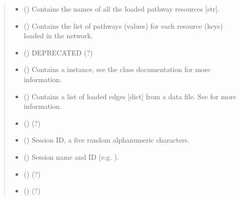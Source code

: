 \documentclass[letterpaper,10pt,english]{sphinxmanual}
\begin{document}
\begin{fulllineitems}
\begin{quote}
\begin{description}
\begin{itemize}
\item {} 
 () \textendash{} Contains the names of all the loaded pathway resources {[}str{]}.

\item {} 
 () \textendash{} Contains the list of pathways (values) for each resource (keys)
loaded in the network.

\item {} 
 () \textendash{} DEPRECATED (?)

\item {} 
 () \textendash{} Contains a 
instance, see the class documentation for more information.

\item {} 
 () \textendash{} Contains a list of loaded edges {[}dict{]} from a data file. See
{\hyperref[\detokenize{reference:pypath.main.PyPath.read_data_file}]{}} for more information.

\item {} 
 () \textendash{} (?)

\item {} 
 () \textendash{} Session ID, a five random alphanumeric characters.

\item {} 
 () \textendash{} Session name and ID (e.g. ).

\item {} 
 () \textendash{} (?)

\item {} 
 () \textendash{} (?)


\end{itemize}
\end{description}
\end{quote}
\end{fulllineitems}
\end{document}
